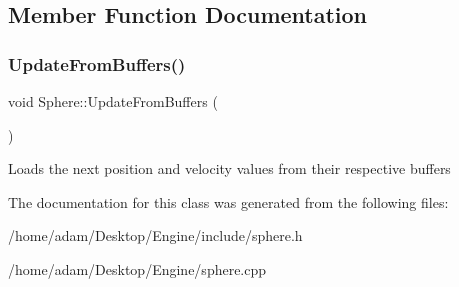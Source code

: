 \subsection{Member Function Documentation}
\mbox{\label{classSphere_acc0ef3890c5c5aa2758c347219e55801}} 
\subsubsection{\texorpdfstring{Update\+From\+Buffers()}{UpdateFromBuffers()}}
{\footnotesize\ttfamily void Sphere\+::\+Update\+From\+Buffers (\begin{DoxyParamCaption}{ }\end{DoxyParamCaption})}

Loads the next position and velocity values from their respective buffers 

The documentation for this class was generated from the following files\+:\begin{DoxyCompactItemize}
\item 
/home/adam/\+Desktop/\+Engine/include/sphere.\+h\item 
/home/adam/\+Desktop/\+Engine/sphere.\+cpp\end{DoxyCompactItemize}
